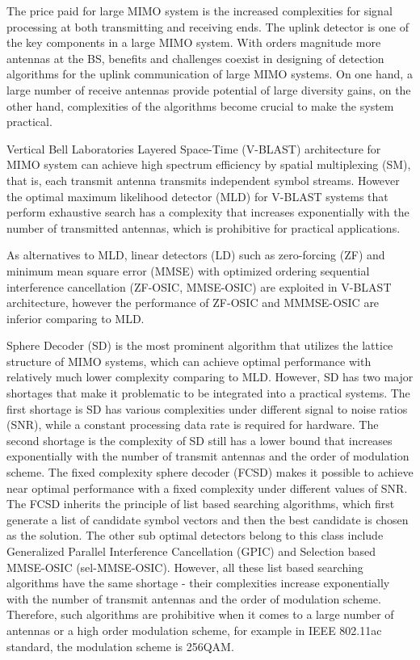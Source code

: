 \documentclass[12pt, draftclsnofoot, onecolumn]{IEEEtran}
\begin{document}
\begin{spacing}{2}
  The price paid for large MIMO system is the increased complexities for signal processing at both transmitting and receiving ends. The uplink detector is one of the key components in a large MIMO system. With orders magnitude more antennas at the BS, benefits and challenges coexist in designing of detection algorithms for the uplink communication of large MIMO systems. On one hand, a large number of receive antennas provide potential of large diversity gains, on the other hand, complexities of the algorithms become crucial to make the system practical. 
  
Vertical Bell Laboratories Layered Space-Time (V-BLAST) architecture for MIMO system can achieve high spectrum efficiency by spatial multiplexing (SM), that is, each transmit antenna transmits independent symbol streams. However the optimal maximum likelihood detector (MLD) for V-BLAST systems that perform exhaustive search has a complexity that increases exponentially with the number of transmitted antennas, which is prohibitive for practical applications. 

As alternatives to MLD, linear detectors (LD) such as zero-forcing (ZF) and minimum mean square error (MMSE) with optimized ordering sequential interference cancellation (ZF-OSIC, MMSE-OSIC) are exploited in V-BLAST architecture\cite{wolniansky1998v}\cite{foschini1999simplified}\cite{benesty2003fast},  however the performance of ZF-OSIC and MMMSE-OSIC are inferior comparing to MLD.
   
Sphere Decoder (SD)\cite{damen2003maximum} is the most prominent algorithm that utilizes the lattice structure of MIMO systems, which can achieve optimal performance with relatively much lower complexity comparing to MLD. However, SD has two major shortages that make it problematic to be integrated into a practical systems. The first shortage is SD has various complexities under different signal to noise ratios (SNR), while a constant processing data rate is required for hardware. The second shortage is the complexity of SD still has a lower bound that increases exponentially with the number of transmit antennas and the order of modulation scheme\cite{jalden2005complexity}.
The fixed complexity sphere decoder (FCSD)\cite{barbero2008fixing} makes it possible to achieve near optimal performance with a fixed complexity under different values of SNR. The FCSD inherits the principle of list based searching algorithms, which first generate a list of candidate symbol vectors and then the best candidate is chosen as the solution. The other sub optimal detectors belong to this class include Generalized Parallel Interference Cancellation (GPIC)\cite{luo2008generalized} and Selection based MMSE-OSIC (sel-MMSE-OSIC)\cite{radji2009interference}. However, all these list based searching algorithms have the same shortage - their complexities increase exponentially with the number of transmit antennas and the order of modulation scheme\cite{radji2009interference}. Therefore, such algorithms are prohibitive when it comes to a large number of antennas or a high order modulation scheme, for example in IEEE 802.11ac standard\cite{IEEE802.11ac}, the modulation scheme is 256QAM. 
 

\end{spacing}
\end{document}
